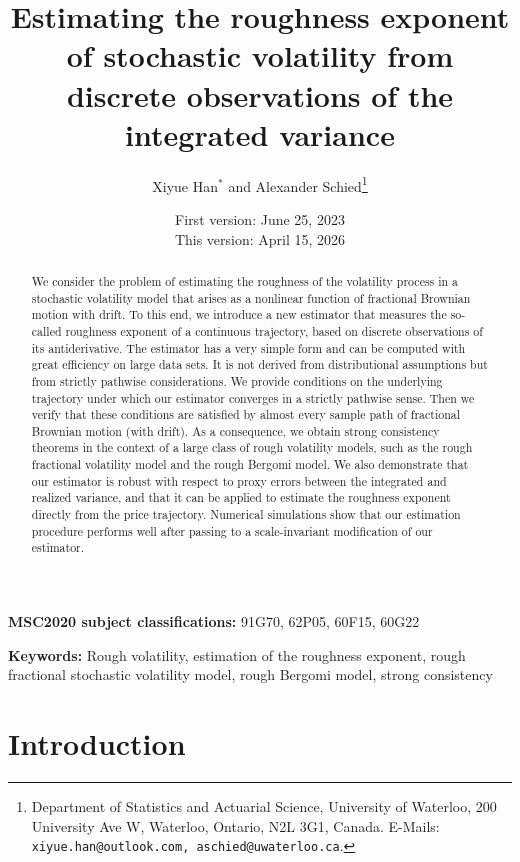 \documentclass[12pt,reqno]{article}
\numberwithin{equation}{section}
\theoremstyle{definition}
\begin{document}
	
	\title{Estimating the roughness exponent of stochastic volatility from discrete observations of the integrated variance}
	\author{Xiyue Han$^*$ and Alexander Schied\thanks{
			Department of Statistics and Actuarial Science, University of Waterloo, 200 University Ave W, Waterloo, Ontario, N2L 3G1, Canada. E-Mails: {\tt xiyue.han@outlook.com, aschied@uwaterloo.ca}.\hfill\break
			}}
	\date{\normalsize First version: June 25, 2023\\
	\normalsize This version: April 15, 2026}
	\maketitle

\begin{abstract} We consider the problem of estimating the roughness of the volatility process in a stochastic volatility model that arises as a nonlinear function of fractional Brownian motion with drift. To this end, we introduce a new estimator that measures the so-called roughness exponent of a continuous trajectory, based on discrete observations of its antiderivative. The estimator has a very simple form and can be computed with great efficiency on large data sets. It is not derived from distributional assumptions but from strictly pathwise considerations.  We provide conditions on the underlying trajectory under which our estimator converges in a strictly pathwise sense. Then we verify that these conditions are satisfied by almost every sample path of fractional Brownian motion (with drift). As a consequence, we obtain strong consistency theorems in the context of a large class of rough volatility models, such as the rough fractional volatility model and the rough Bergomi model. We also demonstrate that our estimator is robust with respect to proxy errors between the integrated and realized variance, and that it can be applied to estimate the roughness exponent directly from the price trajectory. Numerical simulations show that our estimation procedure performs well after passing to a scale-invariant modification of our estimator. 
\end{abstract}

\smallskip
\noindent
\textbf{MSC2020 subject classifications:} 91G70, 62P05, 60F15, 60G22

\smallskip
\noindent
\textbf{Keywords:} Rough volatility, estimation of the roughness exponent, rough fractional stochastic volatility model, rough Bergomi model, strong consistency


\section{Introduction}
\end{document}
